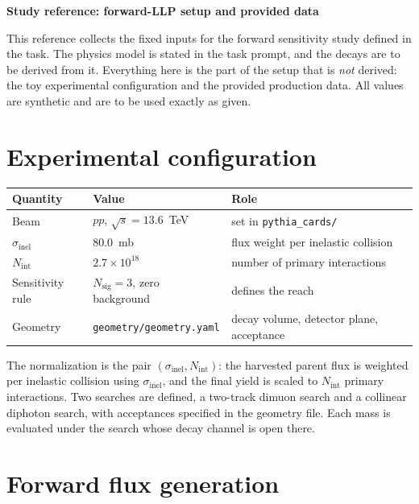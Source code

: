 \documentclass[11pt]{article}
\begin{document}
\begin{center}
{\large\bfseries Study reference: forward-LLP setup and provided data}
\end{center}

\author{Tony Menzo}

\noindent
This reference collects the fixed inputs for the forward sensitivity study
defined in the task. The physics model is stated in the task prompt, and the
decays are to be derived from it. Everything here is the part of the setup that
is \emph{not} derived: the toy experimental configuration and the provided
production data. All values are synthetic and are to be used exactly as given.

\section*{Experimental configuration}

\begin{center}
\begin{tabular}{@{}lll@{}}
\toprule
Quantity & Value & Role \\
\midrule
Beam & $pp$, $\sqrt{s} = 13.6$~TeV & set in \texttt{pythia\_cards/} \\
$\sigma_{\mathrm{inel}}$ & $80.0$~mb & flux weight per inelastic collision \\
$N_{\mathrm{int}}$ & $2.7\times10^{18}$ & number of primary interactions \\
Sensitivity rule & $N_{\mathrm{sig}} = 3$, zero background & defines the reach \\
Geometry & \texttt{geometry/geometry.yaml} & decay volume, detector plane, acceptance \\
\bottomrule
\end{tabular}
\end{center}

\noindent
The normalization is the pair $(\sigma_{\mathrm{inel}}, N_{\mathrm{int}})$: the
harvested parent flux is weighted per inelastic collision using
$\sigma_{\mathrm{inel}}$, and the final yield is scaled to $N_{\mathrm{int}}$
primary interactions. Two searches are defined, a two-track dimuon search and a
collinear diphoton search, with acceptances specified in the geometry file. Each
mass is evaluated under the search whose decay channel is open there.

\section*{Forward flux generation}
\end{document}
